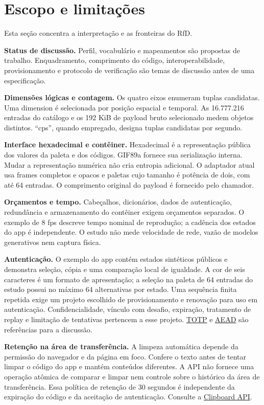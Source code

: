 \documentclass[
  11pt,
  a4paper,
]{article}
\begin{document}
\hypertarget{escopo-e-limitauxe7uxf5es}{%
\section{Escopo e limitações}\label{escopo-e-limitauxe7uxf5es}}

Esta seção concentra a interpretação e as fronteiras do RfD.

\textbf{Status de discussão.} Perfil, vocabulário e mapeamentos são
propostas de trabalho. Enquadramento, comprimento do código,
interoperabilidade, provisionamento e protocolo de verificação são temas
de discussão antes de uma especificação.

\textbf{Dimensões lógicas e contagem.} Os quatro eixos enumeram tuplas
candidatas. Uma dimension é selecionada por posição espacial e temporal.
As 16.777.216 entradas do catálogo e os 192 KiB de payload bruto
selecionado medem objetos distintos. ``cps'', quando empregado, designa
tuplas candidatas por segundo.

\textbf{Interface hexadecimal e contêiner.} Hexadecimal é a
representação pública dos valores da paleta e dos códigos. GIF89a
fornece sua serialização interna. Mudar a representação numérica não
cria entropia adicional. O adaptador atual usa frames completos e opacos
e paletas cujo tamanho é potência de dois, com até 64 entradas. O
comprimento original do payload é fornecido pelo chamador.

\textbf{Orçamentos e tempo.} Cabeçalhos, dicionários, dados de
autenticação, redundância e armazenamento do contêiner exigem orçamentos
separados. O exemplo de 8 fps descreve tempo nominal de reprodução; a
cadência dos estados do app é independente. O estudo não mede velocidade
de rede, vazão de modelos generativos nem captura física.

\textbf{Autenticação.} O exemplo do app contém estados sintéticos
públicos e demonstra seleção, cópia e uma comparação local de igualdade.
A cor de seis caracteres é um formato de apresentação; a seleção na
paleta de 64 entradas do estudo possui no máximo 64 alternativas por
estado. Uma sequência finita repetida exige um projeto escolhido de
provisionamento e renovação para uso em autenticação. Confidencialidade,
vínculo com desafio, expiração, tratamento de replay e limitação de
tentativas pertencem a esse projeto.
\href{https://www.rfc-editor.org/rfc/rfc6238.html}{TOTP} e
\href{https://www.rfc-editor.org/rfc/rfc5116.html}{AEAD} são referências
para a discussão.

\textbf{Retenção na área de transferência.} A limpeza automática depende
da permissão do navegador e da página em foco. Confere o texto antes de
tentar limpar o código do app e mantém conteúdos diferentes. A API não
fornece uma operação atômica de comparar e limpar nem controle sobre o
histórico da área de transferência. Essa política de retenção de 30
segundos é independente da expiração do código e da aceitação de
autenticação. Consulte a
\href{https://www.w3.org/TR/clipboard-apis/}{Clipboard API}.
\end{document}
